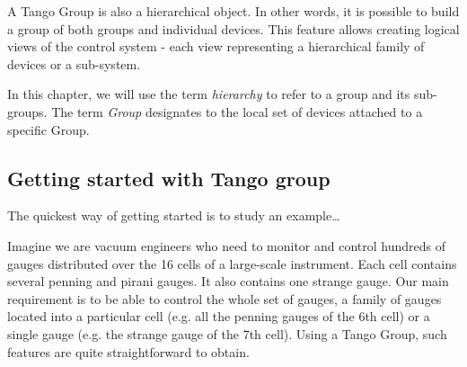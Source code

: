 A Tango Group is also a hierarchical object. In other words, it is
possible to build a group of both groups and individual devices. This
feature allows creating logical views of the control system - each
view representing a hierarchical family of devices or a sub-system. 

In this chapter, we will use the term \emph{hierarchy} to refer to
a group and its sub-groups. The term \emph{Group} designates to the
local set of devices attached to a specific Group. 

\subsection{Getting started with Tango group}

The quickest way of getting started is to study an example\ldots{}

Imagine we are vacuum engineers who need to monitor and control hundreds
of gauges distributed over the 16 cells of a large-scale instrument.
Each cell contains several penning and pirani gauges. It also contains
one \textquotedbl{}strange\textquotedbl{} gauge. Our main requirement
is to be able to control the whole set of gauges, a family of gauges
located into a particular cell (e.g. all the penning gauges of the
6th cell) or a single gauge (e.g. the strange gauge of the 7th cell).
Using a Tango Group, such features are quite straightforward to obtain. 


